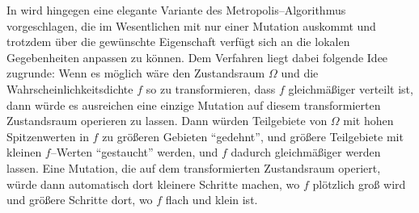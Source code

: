 	In \citep{Kelemen:2002p8514} wird hingegen eine elegante Variante des Metropolis--Algorithmus vorgeschlagen, die im Wesentlichen mit nur einer Mutation auskommt und trotzdem über die gewünschte Eigenschaft verfügt sich an die lokalen Gegebenheiten anpassen zu können. Dem Verfahren liegt dabei folgende Idee zugrunde: Wenn es möglich wäre den Zustandsraum $\Omega$ und die Wahrscheinlichkeitsdichte $f$ so zu transformieren, 	dass $f$ gleichmäßiger verteilt ist, dann würde es ausreichen eine einzige Mutation auf diesem transformierten Zustandsraum operieren zu lassen. Dann würden Teilgebiete von $\Omega$ mit hohen Spitzenwerten in $f$ zu größeren Gebieten ``gedehnt'', und größere Teilgebiete mit kleinen $f$--Werten ``gestaucht'' werden, und $f$ dadurch gleichmäßiger werden lassen. Eine Mutation, die auf dem transformierten Zustandsraum operiert, würde dann automatisch dort kleinere Schritte machen, wo $f$ plötzlich groß wird und größere Schritte dort, wo $f$ flach und klein ist.
	
